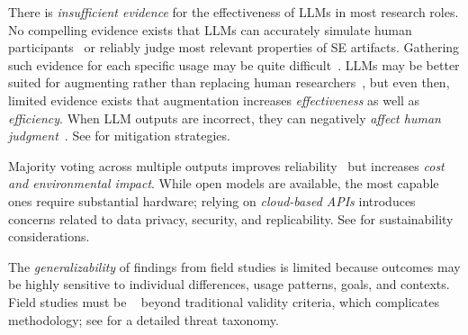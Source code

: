 There is \emph{insufficient evidence} for the effectiveness of LLMs in most research roles. No compelling evidence exists that LLMs can accurately simulate human participants~\cite{schroder2026limits} or reliably judge most relevant properties of SE artifacts. Gathering such evidence for each specific usage may be quite difficult~\cite{DBLP:journals/ais/HardingDLL24}. LLMs may be better suited for augmenting rather than replacing human researchers~\cite{DBLP:conf/emnlp/WangLXZZ21, DBLP:conf/chi/HeHDRH24}, but even then, limited evidence exists that augmentation increases \emph{effectiveness} as well as \emph{efficiency}. When LLM outputs are incorrect, they can negatively \emph{affect human judgment}~\cite{DBLP:conf/www/HuangKA23a}. See \humanvalidation for mitigation strategies.

Majority voting across multiple outputs improves reliability~\cite{DBLP:journals/corr/abs-2304-11085} but increases \emph{cost and environmental impact}. While open models are available, the most capable ones require substantial hardware; relying on \emph{cloud-based APIs} introduces concerns related to data privacy, security, and replicability. See \limitationsmitigations for sustainability considerations.

The \emph{generalizability} of findings from field studies is limited because outcomes may be highly sensitive to individual differences, usage patterns, goals, and contexts. Field studies must be ~\cite{Sullivan2011-ub} beyond traditional validity criteria, which complicates methodology; see \limitationsmitigations for a detailed threat taxonomy.

